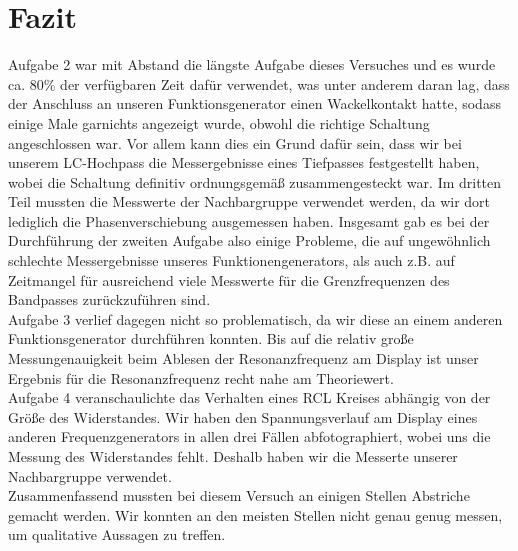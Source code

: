 \documentclass[12pt]{scrartcl}
\begin{document}
\section{Fazit}
Aufgabe 2 war mit Abstand die längste Aufgabe dieses Versuches und es wurde ca. 80\% der verfügbaren Zeit dafür verwendet, was unter anderem daran lag, dass der Anschluss an unseren Funktionsgenerator einen Wackelkontakt hatte, sodass einige Male garnichts angezeigt wurde, obwohl die richtige Schaltung angeschlossen war. Vor allem kann dies ein Grund dafür sein, dass wir bei unserem LC-Hochpass die Messergebnisse eines Tiefpasses festgestellt haben, wobei die Schaltung definitiv ordnungsgemäß zusammengesteckt war. Im dritten Teil mussten die Messwerte der Nachbargruppe verwendet werden, da wir dort lediglich die Phasenverschiebung ausgemessen haben.
Insgesamt gab es bei der Durchführung der zweiten Aufgabe also einige Probleme, die auf ungewöhnlich schlechte Messergebnisse unseres Funktionengenerators, als auch z.B. auf Zeitmangel für ausreichend viele Messwerte
für die Grenzfrequenzen des Bandpasses zurückzuführen sind.\\
Aufgabe 3 verlief dagegen nicht so problematisch, da wir diese an einem anderen Funktionsgenerator durchführen konnten. Bis auf die relativ große Messungenauigkeit beim Ablesen der Resonanzfrequenz am Display ist unser Ergebnis für die Resonanzfrequenz recht nahe am Theoriewert.\\
Aufgabe 4 veranschaulichte das Verhalten eines RCL Kreises abhängig von der Größe des Widerstandes. Wir haben den Spannungsverlauf am Display eines anderen Frequenzgenerators in allen drei Fällen abfotographiert, wobei uns die Messung des Widerstandes fehlt. Deshalb haben wir die Messerte unserer Nachbargruppe verwendet.\\
Zusammenfassend mussten bei diesem Versuch an einigen Stellen Abstriche gemacht werden. Wir konnten an den meisten Stellen nicht genau genug messen, um qualitative Aussagen zu treffen.
\end{document}
